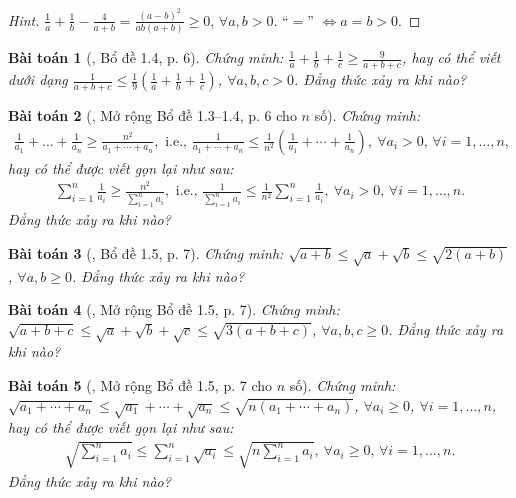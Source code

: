 \documentclass{article}
\newtheorem{baitoan}{Bài toán}
\begin{document}
\begin{proof}[Hint]
	$\frac{1}{a} + \frac{1}{b} - \frac{4}{a + b} = \frac{(a - b)^2}{ab(a + b)}\ge 0$, $\forall a,b > 0$. ``$=$'' $\Leftrightarrow a = b > 0$.
\end{proof}

\begin{baitoan}[\cite{Son_Nghiep_Trung_Can2021}, Bổ đề 1.4, p. 6]
	Chứng minh: $\frac{1}{a} + \frac{1}{b} + \frac{1}{c}\ge\frac{9}{a + b + c}$, hay có thể viết dưới dạng $\frac{1}{a + b + c}\le\frac{1}{9}\left(\frac{1}{a} + \frac{1}{b} + \frac{1}{c}\right)$, $\forall a,b,c > 0$. Đẳng thức xảy ra khi nào?
\end{baitoan}

\begin{baitoan}[\cite{Son_Nghiep_Trung_Can2021}, Mở rộng Bổ đề 1.3--1.4, p. 6 cho $n$ số]
	Chứng minh:
	\begin{align*}
		\frac{1}{a_1} + \ldots + \frac{1}{a_n}\ge\frac{n^2}{a_1 + \cdots + a_n},\mbox{ i.e., }\frac{1}{a_1 + \cdots + a_n}\le\frac{1}{n^2}\left(\frac{1}{a_1} + \cdots + \frac{1}{a_n}\right),\ \forall a_i > 0,\,\forall i = 1,\ldots,n,
	\end{align*}
	hay có thể được viết gọn lại như sau:
	\begin{align*}
		\sum_{i=1}^{n} \frac{1}{a_i}\ge\frac{n^2}{\sum_{i=1}^n a_i},\mbox{ i.e., }\frac{1}{\sum_{i=1}^n a_i}\le\frac{1}{n^2}\sum_{i=1}^n \frac{1}{a_i},\ \forall a_i > 0,\,\forall i = 1,\ldots,n.
	\end{align*}
	Đẳng thức xảy ra khi nào?
\end{baitoan}

\begin{baitoan}[\cite{Son_Nghiep_Trung_Can2021}, Bổ đề 1.5, p. 7]
	Chứng minh: $\sqrt{a + b}\le\sqrt{a} + \sqrt{b}\le\sqrt{2(a + b)}$, $\forall a,b\ge 0$. Đẳng thức xảy ra khi nào?
\end{baitoan}

\begin{baitoan}[\cite{Son_Nghiep_Trung_Can2021}, Mở rộng Bổ đề 1.5, p. 7]
	Chứng minh: $\sqrt{a + b + c}\le\sqrt{a} + \sqrt{b} + \sqrt{c}\le\sqrt{3(a + b + c)}$, $\forall a,b,c\ge 0$. Đẳng thức xảy ra khi nào?
\end{baitoan}

\begin{baitoan}[\cite{Son_Nghiep_Trung_Can2021}, Mở rộng Bổ đề 1.5, p. 7 cho $n$ số]
	Chứng minh: $\sqrt{a_1 + \cdots + a_n}\le\sqrt{a_1} + \cdots + \sqrt{a_n}\le\sqrt{n(a_1 + \cdots + a_n)}$, $\forall a_i\ge 0$, $\forall i = 1,\ldots,n$, hay có thể được viết gọn lại như sau:
	\begin{align*}
		\sqrt{\sum_{i=1}^n a_i}\le\sum_{i=1}^n \sqrt{a_i}\le\sqrt{n\sum_{i=1}^n a_i},\ \forall a_i\ge 0,\,\forall i = 1,\ldots,n.
	\end{align*}
	Đẳng thức xảy ra khi nào?
\end{baitoan}
\end{document}
